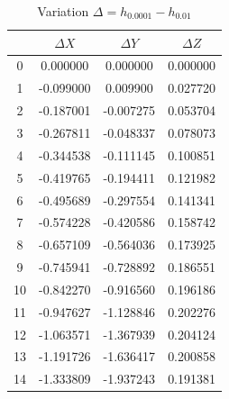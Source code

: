 \documentclass[12pt, a4paper]{article}
\begin{document}
	\begin{table}[H]
		\centering
		\footnotesize
		\begin{tabular}{|c|c|c|c|}
			\toprule
			   & $\Delta X$ & $\Delta Y$ & $\Delta Z$ \\
			\midrule
			0  & 0.000000   & 0.000000   & 0.000000   \\
			1  & -0.099000  & 0.009900   & 0.027720   \\
			2  & -0.187001  & -0.007275  & 0.053704   \\
			3  & -0.267811  & -0.048337  & 0.078073   \\
			4  & -0.344538  & -0.111145  & 0.100851   \\
			5  & -0.419765  & -0.194411  & 0.121982   \\
			6  & -0.495689  & -0.297554  & 0.141341   \\
			7  & -0.574228  & -0.420586  & 0.158742   \\
			8  & -0.657109  & -0.564036  & 0.173925   \\
			9  & -0.745941  & -0.728892  & 0.186551   \\
			10 & -0.842270  & -0.916560  & 0.196186   \\
			11 & -0.947627  & -1.128846  & 0.202276   \\
			12 & -1.063571  & -1.367939  & 0.204124   \\
			13 & -1.191726  & -1.636417  & 0.200858   \\
			14 & -1.333809  & -1.937243  & 0.191381   \\
			\bottomrule
		\end{tabular}
		\caption{Variation $\Delta = h_{0.0001} - h_{0.01}$}
	\end{table}
	    
\end{document}
